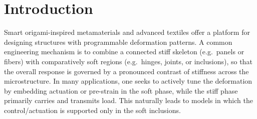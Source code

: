 \documentclass[11pt,a4paper]{article}
\numberwithin{equation}{section}
\def\e{\varepsilon}
\begin{document}
\begin{abstract}
	This paper investigates the asymptotic analysis of an optimal control problem (OCP) posed on a high-contrast elastic medium with soft periodic inclusions, governed by a semilinear elasticity system with a nonlocal term. The domain consists of a connected matrix phase and a soft inclusion phase. The model depends on two independent small parameters: the periodicity $\varepsilon>0$ and the contrast $\delta>0$, and the distributed control acts only in the inclusion region. We consider an $L^2$-tracking cost on the displacement and analyze the limit as $(\varepsilon,\delta)\to(0,0)$ in the regime
	\[ 
	 \lim_{(\varepsilon,\delta)\to(0,0)}\frac{\delta}{\varepsilon}=\kappa\in(0,+\infty].
	\]
	First, we derive the homogenized (limit) state system associated with this scaling. We then formulate the limit OCP and prove that the limit of the microscopic optimal controls is an optimal control for the limit problem, using a $\Gamma$-convergence approach.
\end{abstract}

\section*{Introduction}
Smart origami-inspired metamaterials \cite{gries} and advanced textiles \cite{orlik01} offer a platform for designing structures with
programmable deformation patterns. A common engineering mechanism is to combine a connected stiff skeleton
(e.g.\ panels or fibers) with comparatively soft regions (e.g.\ hinges, joints, or inclusions), so that the
overall response is governed by a pronounced contrast of stiffness across the microstructure. In many
applications, one seeks to actively tune the deformation by embedding actuation or pre-strain in the
soft phase, while the stiff phase primarily carries and transmits load. This naturally leads to models in
which the control/actuation is supported only in the soft inclusions.
\end{document}
